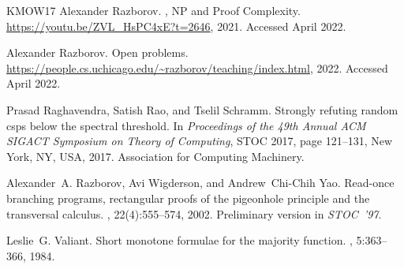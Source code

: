 \documentclass[10pt,a4paper]{article}
\theoremstyle{plain}
\theoremstyle{remark}
\theoremstyle{definition}
\begin{document}
\begin{thebibliography}{KMOW17}
Alexander Razborov.
, {NP} and {Proof Complexity}.
\newblock \url{https://youtu.be/ZVL_HsPC4xE?t=2646}, 2021.
\newblock Accessed April 2022.

Alexander Razborov.
\newblock Open problems.
\newblock \url{https://people.cs.uchicago.edu/~razborov/teaching/index.html},
  2022.
\newblock Accessed April 2022.

Prasad Raghavendra, Satish Rao, and Tselil Schramm.
\newblock Strongly refuting random csps below the spectral threshold.
\newblock In {\em Proceedings of the 49th Annual ACM SIGACT Symposium on Theory
  of Computing}, STOC 2017, page 121–131, New York, NY, USA, 2017.
  Association for Computing Machinery.

Alexander~A. Razborov, Avi Wigderson, and Andrew~Chi{-}Chih Yao.
\newblock Read-once branching programs, rectangular proofs of the pigeonhole
  principle and the transversal calculus.
, 22(4):555--574, 2002.
\newblock Preliminary version in \emph{STOC~'97}.

Leslie~G. Valiant.
\newblock Short monotone formulae for the majority function.
, 5:363--366, 1984.

\end{thebibliography}
\end{document}
